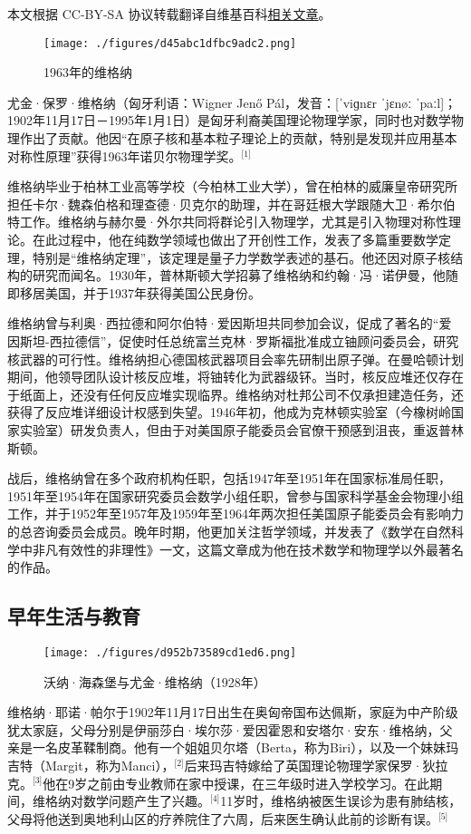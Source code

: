 
本文根据 CC-BY-SA 协议转载翻译自维基百科\href{https://en.wikipedia.org/wiki/Eugene_Wigner}{相关文章}。

\begin{figure}[ht]
\centering
\texttt{[image: ./figures/d45abc1dfbc9adc2.png]}
\caption{1963年的维格纳} \label{fig_YJwgn_1}
\end{figure}
尤金·保罗·维格纳（匈牙利语：Wigner Jenő Pál，发音：[ˈviɡnɛr ˈjɛnøː ˈpaːl]；1902年11月17日－1995年1月1日）是匈牙利裔美国理论物理学家，同时也对数学物理作出了贡献。他因“在原子核和基本粒子理论上的贡献，特别是发现并应用基本对称性原理”获得1963年诺贝尔物理学奖。\(^\text{[1]}\)

维格纳毕业于柏林工业高等学校（今柏林工业大学），曾在柏林的威廉皇帝研究所担任卡尔·魏森伯格和理查德·贝克尔的助理，并在哥廷根大学跟随大卫·希尔伯特工作。维格纳与赫尔曼·外尔共同将群论引入物理学，尤其是引入物理对称性理论。在此过程中，他在纯数学领域也做出了开创性工作，发表了多篇重要数学定理，特别是“维格纳定理”，该定理是量子力学数学表述的基石。他还因对原子核结构的研究而闻名。1930年，普林斯顿大学招募了维格纳和约翰·冯·诺伊曼，他随即移居美国，并于1937年获得美国公民身份。

维格纳曾与利奥·西拉德和阿尔伯特·爱因斯坦共同参加会议，促成了著名的“爱因斯坦-西拉德信”，促使时任总统富兰克林·罗斯福批准成立铀顾问委员会，研究核武器的可行性。维格纳担心德国核武器项目会率先研制出原子弹。在曼哈顿计划期间，他领导团队设计核反应堆，将铀转化为武器级钚。当时，核反应堆还仅存在于纸面上，还没有任何反应堆实现临界。维格纳对杜邦公司不仅承担建造任务，还获得了反应堆详细设计权感到失望。1946年初，他成为克林顿实验室（今橡树岭国家实验室）研发负责人，但由于对美国原子能委员会官僚干预感到沮丧，重返普林斯顿。

战后，维格纳曾在多个政府机构任职，包括1947年至1951年在国家标准局任职，1951年至1954年在国家研究委员会数学小组任职，曾参与国家科学基金会物理小组工作，并于1952年至1957年及1959年至1964年两次担任美国原子能委员会有影响力的总咨询委员会成员。晚年时期，他更加关注哲学领域，并发表了《数学在自然科学中非凡有效性的非理性》一文，这篇文章成为他在技术数学和物理学以外最著名的作品。
\subsection{早年生活与教育}
\begin{figure}[ht]
\centering
\texttt{[image: ./figures/d952b73589cd1ed6.png]}
\caption{沃纳·海森堡与尤金·维格纳（1928年）} \label{fig_YJwgn_3}
\end{figure}
维格纳·耶诺·帕尔于1902年11月17日出生在奥匈帝国布达佩斯，家庭为中产阶级犹太家庭，父母分别是伊丽莎白·埃尔莎·爱因霍恩和安塔尔·安东·维格纳，父亲是一名皮革鞣制商。他有一个姐姐贝尔塔（Berta，称为Biri），以及一个妹妹玛吉特（Margit，称为Manci），\(^\text{[2]}\)后来玛吉特嫁给了英国理论物理学家保罗·狄拉克。\(^\text{[3]}\)他在9岁之前由专业教师在家中授课，在三年级时进入学校学习。在此期间，维格纳对数学问题产生了兴趣。\(^\text{[4]}\)11岁时，维格纳被医生误诊为患有肺结核，父母将他送到奥地利山区的疗养院住了六周，后来医生确认此前的诊断有误。\(^\text{[5]}\)

